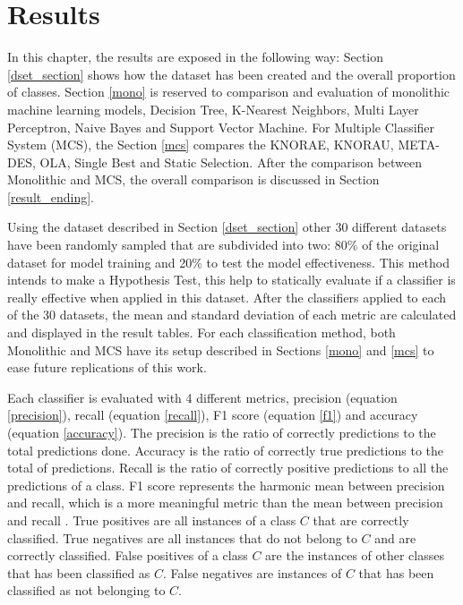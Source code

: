 \chapter{Results}\label{chapter:results}

In this chapter, the results are exposed in the following way: Section \ref{dset_section} shows how the dataset has been created and the overall proportion of classes. Section \ref{mono} is reserved to comparison and evaluation of monolithic machine learning models, Decision Tree, K-Nearest Neighbors, Multi Layer Perceptron, Naive Bayes and Support Vector Machine. For Multiple Classifier System (MCS), the Section \ref{mcs} compares the KNORAE, KNORAU, META-DES, OLA, Single Best and Static Selection. After the comparison between Monolithic and MCS, the overall comparison is discussed in Section \ref{result_ending}.

Using the dataset described in Section \ref{dset_section} other 30 different datasets have been randomly sampled that are subdivided into two: 80\% of the original dataset for model training and 20\% to test the model effectiveness. This method intends to make a Hypothesis Test, this help to statically evaluate if a classifier is really effective when applied in this dataset. After the classifiers applied to each of the 30 datasets, the mean and standard deviation of each metric are calculated and displayed in the result tables. For each classification method, both Monolithic and MCS have its setup described in Sections \ref{mono} and \ref{mcs} to ease future replications of this work. 

Each classifier is evaluated with 4 different metrics, precision (equation \ref{precision}), recall (equation \ref{recall}), F1 score (equation \ref{f1}) and accuracy (equation \ref{accuracy}). The precision is the ratio of correctly predictions to the total predictions done. Accuracy is the ratio of correctly true predictions to the total of predictions. Recall is the ratio of correctly positive predictions to all the predictions of a class. F1 score represents the harmonic mean between precision and recall, which is a more meaningful metric than the mean between precision and recall \cite{sasaki2007truth}. True positives are all instances of a class $C$ that are correctly classified. True negatives are all instances that do not belong to $C$ and are correctly classified. False positives of a class $C$ are the instances of other classes that has been classified as $C$. False negatives are instances of $C$ that has been classified as not belonging to $C$.

